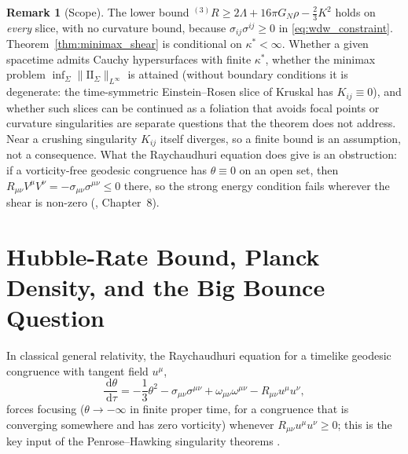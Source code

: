 \documentclass[11pt,a4paper,reqno]{amsart}
\theoremstyle{definition}
\newtheorem{remark}[theorem]{Remark}
\numberwithin{equation}{section}
\newcommand{\II}{\mathrm{I\!I}}
\newcommand{\dif}{\,\mathrm{d}}
\begin{document}
\begin{remark}[Scope]
\label{rem:adm_scope}
The lower bound ${}^{(3)}R \ge 2\Lambda + 16\pi G_N\rho - \frac{2}{3}K^2$ holds on \emph{every} slice, with no curvature bound, because $\sigma_{ij}\sigma^{ij} \ge 0$ in \eqref{eq:wdw_constraint}. Theorem~\ref{thm:minimax_shear} is conditional on $\kappa^* < \infty$. Whether a given spacetime admits Cauchy hypersurfaces with finite $\kappa^*$, whether the minimax problem $\inf_\Sigma \|\II_\Sigma\|_{L^\infty}$ is attained (without boundary conditions it is degenerate: the time-symmetric Einstein--Rosen slice of Kruskal has $K_{ij} \equiv 0$), and whether such slices can be continued as a foliation that avoids focal points or curvature singularities are separate questions that the theorem does not address. Near a crushing singularity $K_{ij}$ itself diverges, so a finite bound is an assumption, not a consequence. What the Raychaudhuri equation does give is an obstruction: if a vorticity-free geodesic congruence has $\theta \equiv 0$ on an open set, then $R_{\mu\nu}V^\mu V^\nu = -\sigma_{\mu\nu}\sigma^{\mu\nu} \le 0$ there, so the strong energy condition fails wherever the shear is non-zero (\cite{silvafilho2026treatise}, Chapter~8).
\end{remark}

\section{Hubble-Rate Bound, Planck Density, and the Big Bounce Question}
\label{sec:big_bounce}

In classical general relativity, the Raychaudhuri equation for a timelike geodesic congruence with tangent field $u^\mu$,
\begin{equation}
    \frac{\dif \theta}{\dif \tau} = -\frac{1}{3}\theta^2 - \sigma_{\mu\nu}\sigma^{\mu\nu} + \omega_{\mu\nu}\omega^{\mu\nu} - R_{\mu\nu}u^\mu u^\nu,
\end{equation}
forces focusing ($\theta \to -\infty$ in finite proper time, for a congruence that is converging somewhere and has zero vorticity) whenever $R_{\mu\nu}u^\mu u^\nu \ge 0$; this is the key input of the Penrose--Hawking singularity theorems \cite{hawking1970singularities}.
\end{document}
